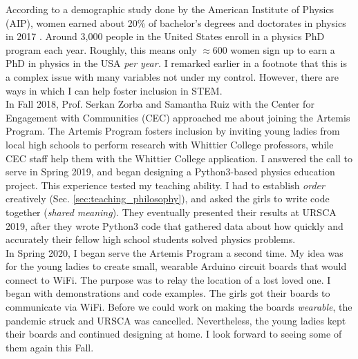 \documentclass[../../../main.tex]{subfiles}
\begin{document}
According to a demographic study done by the American Institute of Physics (AIP), women earned about 20\% of bachelor's degrees and doctorates in physics in 2017 \cite{aip}.  Around 3,000 people in the United States enroll in a physics PhD program each year.  Roughly, this means only $\approx 600$ women sign up to earn a PhD in physics in the USA \textit{per year.}  I remarked earlier in a footnote that this is a complex issue with many variables not under my control.  However, there are ways in which I can help foster inclusion in STEM.
\\
\vspace{0.15cm}
In Fall 2018, Prof. Serkan Zorba and Samantha Ruiz with the Center for Engagement with Communities (CEC) approached me about joining the Artemis Program.  The Artemis Program fosters inclusion by inviting young ladies from local high schools to perform research with Whittier College professors, while CEC staff help them with the Whittier College application.  I answered the call to serve in Spring 2019, and began designing a Python3-based physics education project.  This experience tested my teaching ability.  I had to establish \textit{order} creatively (Sec. \ref{sec:teaching_philosophy}), and asked the girls to write code together (\textit{shared meaning}).  They eventually presented their results at URSCA 2019, after they wrote Python3 code that gathered data about how quickly and accurately their fellow high school students solved physics problems.
\\
\vspace{0.15cm}
In Spring 2020, I began serve the Artemis Program a second time.  My idea was for the young ladies to create small, wearable Arduino circuit boards that would connect to WiFi.  The purpose was to relay the location of a lost loved one.  I began with demonstrations and code examples.  The girls got their boards to communicate via WiFi.  Before we could work on making the boards \textit{wearable}, the pandemic struck and URSCA was cancelled.  Nevertheless, the young ladies kept their boards and continued designing at home.  I look forward to seeing some of them again this Fall.
\end{document}
